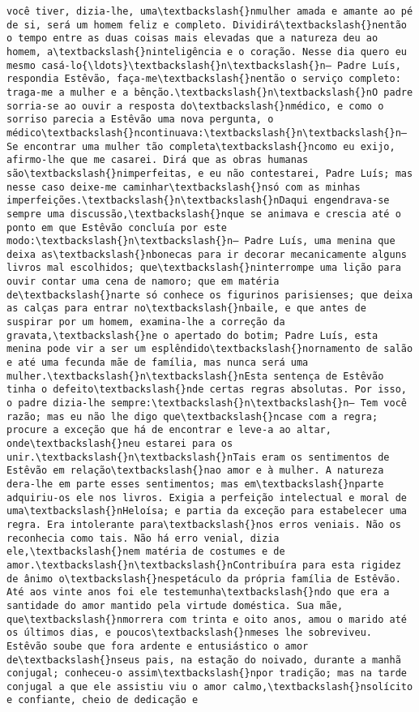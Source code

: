 \documentclass[11pt]{article}
\begin{document}
\begin{Verbatim}[commandchars=\\\{\}]
você tiver, dizia-lhe, uma\textbackslash{}nmulher amada e amante ao pé de si, será um homem feliz e completo. Dividirá\textbackslash{}nentão o tempo entre as duas coisas mais elevadas que a natureza deu ao homem, a\textbackslash{}ninteligência e o coração. Nesse dia quero eu mesmo casá-lo{\ldots}\textbackslash{}n\textbackslash{}n— Padre Luís, respondia Estêvão, faça-me\textbackslash{}nentão o serviço completo: traga-me a mulher e a bênção.\textbackslash{}n\textbackslash{}nO padre sorria-se ao ouvir a resposta do\textbackslash{}nmédico, e como o sorriso parecia a Estêvão uma nova pergunta, o médico\textbackslash{}ncontinuava:\textbackslash{}n\textbackslash{}n— Se encontrar uma mulher tão completa\textbackslash{}ncomo eu exijo, afirmo-lhe que me casarei. Dirá que as obras humanas são\textbackslash{}nimperfeitas, e eu não contestarei, Padre Luís; mas nesse caso deixe-me caminhar\textbackslash{}nsó com as minhas imperfeições.\textbackslash{}n\textbackslash{}nDaqui engendrava-se sempre uma discussão,\textbackslash{}nque se animava e crescia até o ponto em que Estêvão concluía por este modo:\textbackslash{}n\textbackslash{}n— Padre Luís, uma menina que deixa as\textbackslash{}nbonecas para ir decorar mecanicamente alguns livros mal escolhidos; que\textbackslash{}ninterrompe uma lição para ouvir contar uma cena de namoro; que em matéria de\textbackslash{}narte só conhece os figurinos parisienses; que deixa as calças para entrar no\textbackslash{}nbaile, e que antes de suspirar por um homem, examina-lhe a correção da gravata,\textbackslash{}ne o apertado do botim; Padre Luís, esta menina pode vir a ser um esplêndido\textbackslash{}nornamento de salão e até uma fecunda mãe de família, mas nunca será uma mulher.\textbackslash{}n\textbackslash{}nEsta sentença de Estêvão tinha o defeito\textbackslash{}nde certas regras absolutas. Por isso, o padre dizia-lhe sempre:\textbackslash{}n\textbackslash{}n— Tem você razão; mas eu não lhe digo que\textbackslash{}ncase com a regra; procure a exceção que há de encontrar e leve-a ao altar, onde\textbackslash{}neu estarei para os unir.\textbackslash{}n\textbackslash{}nTais eram os sentimentos de Estêvão em relação\textbackslash{}nao amor e à mulher. A natureza dera-lhe em parte esses sentimentos; mas em\textbackslash{}nparte adquiriu-os ele nos livros. Exigia a perfeição intelectual e moral de uma\textbackslash{}nHeloísa; e partia da exceção para estabelecer uma regra. Era intolerante para\textbackslash{}nos erros veniais. Não os reconhecia como tais. Não há erro venial, dizia ele,\textbackslash{}nem matéria de costumes e de amor.\textbackslash{}n\textbackslash{}nContribuíra para esta rigidez de ânimo o\textbackslash{}nespetáculo da própria família de Estêvão. Até aos vinte anos foi ele testemunha\textbackslash{}ndo que era a santidade do amor mantido pela virtude doméstica. Sua mãe, que\textbackslash{}nmorrera com trinta e oito anos, amou o marido até os últimos dias, e poucos\textbackslash{}nmeses lhe sobreviveu. Estêvão soube que fora ardente e entusiástico o amor de\textbackslash{}nseus pais, na estação do noivado, durante a manhã conjugal; conheceu-o assim\textbackslash{}npor tradição; mas na tarde conjugal a que ele assistiu viu o amor calmo,\textbackslash{}nsolícito e confiante, cheio de dedicação e 
\end{Verbatim}
\end{document}
